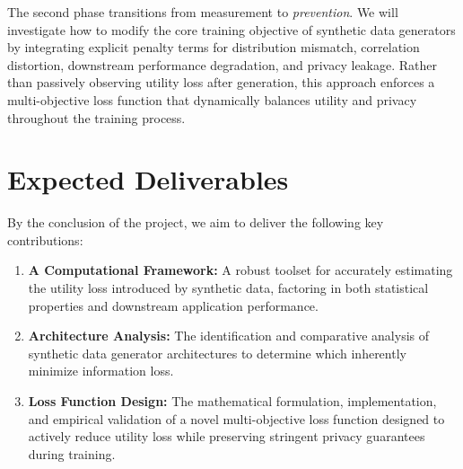 \documentclass[11pt, a4paper]{article}
\begin{document}
The second phase transitions from measurement to \textit{prevention}. We will investigate how to modify the core training objective of synthetic data generators by integrating explicit penalty terms for distribution mismatch, correlation distortion, downstream performance degradation, and privacy leakage. Rather than passively observing utility loss after generation, this approach enforces a multi-objective loss function that dynamically balances utility and privacy throughout the training process.

\section*{Expected Deliverables}
By the conclusion of the project, we aim to deliver the following key contributions:
\begin{enumerate}
    \item \textbf{A Computational Framework:} A robust toolset for accurately estimating the utility loss introduced by synthetic data, factoring in both statistical properties and downstream application performance.
    \item \textbf{Architecture Analysis:} The identification and comparative analysis of synthetic data generator architectures to determine which inherently minimize information loss.
    \item \textbf{Loss Function Design:} The mathematical formulation, implementation, and empirical validation of a novel multi-objective loss function designed to actively reduce utility loss while preserving stringent privacy guarantees during training.
\end{enumerate}
\end{document}
